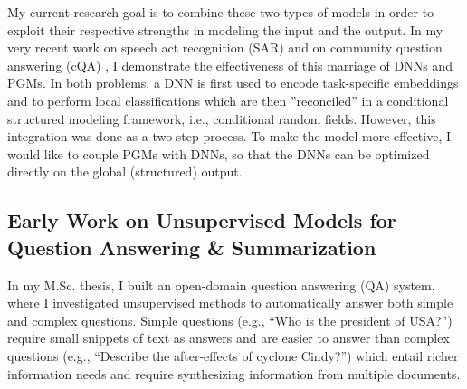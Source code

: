 \documentclass{article} %
\begin{document}
My current research goal is to combine these two types of models in order to exploit their respective strengths in modeling the input and the output. In my very recent work on speech act recognition (SAR) \cite{Shafiq16ACL} and on community question answering (cQA) \cite{Shafiq16_cqa_tacl}, I demonstrate the effectiveness of this marriage of DNNs and PGMs. In both problems, a DNN is first used to encode task-specific embeddings and to perform local classifications which are then ''reconciled'' in a conditional structured modeling framework, i.e., conditional random fields. However, this integration was done as a two-step process. To make the model more effective, I would like to couple PGMs with DNNs, so that the DNNs can be optimized directly on the global (structured) output. 






\subsection{Early Work on Unsupervised Models for Question Answering \& Summarization} \label{summ}

In my M.Sc. thesis, I built an open-domain question answering (QA) system, where I investigated unsupervised methods to automatically answer both simple and complex questions. Simple questions (e.g., ``Who is the president of USA?'') require small snippets of text as answers and are easier to answer than complex questions (e.g., ``Describe the after-effects of cyclone Cindy?'') which entail richer information needs and require synthesizing information from multiple documents.
\end{document}
